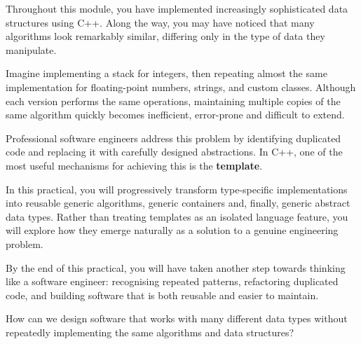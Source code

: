 \documentclass{csc2059practical}
\begin{document}
\maketitle

\tableofcontents
\clearpage



Throughout this module, you have implemented increasingly sophisticated data
structures using C++. Along the way, you may have noticed that many algorithms
look remarkably similar, differing only in the type of data they manipulate.

Imagine implementing a stack for integers, then repeating almost the same
implementation for floating-point numbers, strings, and custom classes. Although
each version performs the same operations, maintaining multiple copies of the
same algorithm quickly becomes inefficient, error-prone and difficult to extend.

Professional software engineers address this problem by identifying duplicated
code and replacing it with carefully designed abstractions. In C++, one of the
most useful mechanisms for achieving this is the \textbf{template}.

In this practical, you will progressively transform type-specific
implementations into reusable generic algorithms, generic containers and,
finally, generic abstract data types. Rather than treating templates as an
isolated language feature, you will explore how they emerge naturally as a
solution to a genuine engineering problem.

By the end of this practical, you will have taken another step towards thinking
like a software engineer: recognising repeated patterns, refactoring duplicated
code, and building software that is both reusable and easier to maintain.

\begin{engineeringquestion}

How can we design software that works with many different data types without
repeatedly implementing the same algorithms and data structures?

\end{engineeringquestion}

\end{document}
